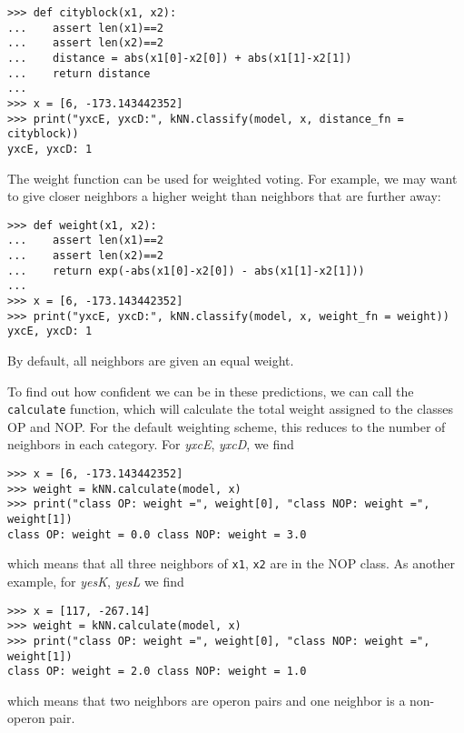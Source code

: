 \documentclass{report}
\begin{document}
\begin{verbatim}
>>> def cityblock(x1, x2):
...    assert len(x1)==2
...    assert len(x2)==2
...    distance = abs(x1[0]-x2[0]) + abs(x1[1]-x2[1])
...    return distance
... 
>>> x = [6, -173.143442352]
>>> print("yxcE, yxcD:", kNN.classify(model, x, distance_fn = cityblock))
yxcE, yxcD: 1
\end{verbatim}

The weight function can be used for weighted voting. For example, we may want to give closer neighbors a higher weight than neighbors that are further away:

\begin{verbatim}
>>> def weight(x1, x2):
...    assert len(x1)==2
...    assert len(x2)==2
...    return exp(-abs(x1[0]-x2[0]) - abs(x1[1]-x2[1]))
... 
>>> x = [6, -173.143442352]
>>> print("yxcE, yxcD:", kNN.classify(model, x, weight_fn = weight))
yxcE, yxcD: 1
\end{verbatim}
By default, all neighbors are given an equal weight.

To find out how confident we can be in these predictions, we can call the \verb+calculate+ function, which will calculate the total weight assigned to the classes OP and NOP. For the default weighting scheme, this reduces to the number of neighbors in each category. For {\it yxcE}, {\it yxcD}, we find
\begin{verbatim}
>>> x = [6, -173.143442352]
>>> weight = kNN.calculate(model, x)
>>> print("class OP: weight =", weight[0], "class NOP: weight =", weight[1])
class OP: weight = 0.0 class NOP: weight = 3.0
\end{verbatim}
which means that all three neighbors of \verb+x1+, \verb+x2+ are in the NOP class. As another example, for {\it yesK}, {\it yesL} we find

\begin{verbatim}
>>> x = [117, -267.14]
>>> weight = kNN.calculate(model, x)
>>> print("class OP: weight =", weight[0], "class NOP: weight =", weight[1])
class OP: weight = 2.0 class NOP: weight = 1.0
\end{verbatim}
which means that two neighbors are operon pairs and one neighbor is a non-operon pair.
\end{document}
